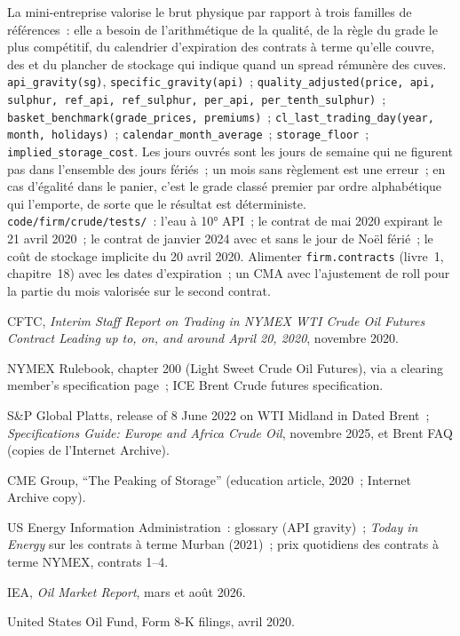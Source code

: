 \begin{build}
 La mini-entreprise valorise le brut physique par rapport à trois familles de
références~: elle a besoin de l'arithmétique de la qualité, de la règle du grade le plus compétitif, du
calendrier d'expiration des contrats à terme qu'elle couvre, des  et du plancher
de stockage qui indique quand un spread rémunère des cuves.
 \texttt{api\_gravity(sg)},
\texttt{specific\_gravity(api)}~; \texttt{quality\_adjusted(price, api, sulphur, ref\_api, ref\_sulphur, per\_api,
per\_tenth\_sulphur)}~; \texttt{basket\_benchmark(grade\_prices, premiums)}~;
\texttt{cl\_last\_trading\_day(year, month, holidays)}~;
\texttt{calendar\_month\_average}~; \texttt{storage\_floor}~;
\texttt{implied\_storage\_cost}.
 Les jours ouvrés sont les jours de semaine qui ne figurent pas dans l'ensemble des jours fériés~; un mois sans
règlement est une erreur~; en cas d'égalité dans le panier, c'est le grade classé premier par ordre alphabétique qui
l'emporte, de sorte que le résultat est déterministe.
 \texttt{code/firm/crude/tests/}~: l'eau à 10° API~; le
contrat de mai 2020 expirant le 21 avril 2020~; le contrat de janvier 2024 avec et sans
le jour de Noël férié~; le coût de stockage implicite du 20 avril 2020.
 Alimenter \texttt{firm.contracts} (livre~1, chapitre~18) avec les dates
d'expiration~; un CMA avec l'ajustement de roll pour la partie du mois valorisée sur le
second contrat.
\end{build}

\begin{omsources}
\item CFTC, \emph{Interim Staff Report on Trading in NYMEX WTI Crude Oil Futures
Contract Leading up to, on, and around April 20, 2020}, novembre 2020.
\item NYMEX Rulebook, chapter 200 (Light Sweet Crude Oil Futures), via a clearing
member's specification page~; ICE Brent Crude futures specification.
\item S\&P Global Platts, release of 8 June 2022 on WTI Midland in Dated Brent~; \emph{Specifications Guide: Europe and Africa Crude
Oil}, novembre 2025, et Brent FAQ (copies de l'Internet Archive).
\item CME Group, ``The Peaking of Storage'' (education article, 2020~; Internet Archive copy).
\item US Energy Information Administration~: glossary (API gravity)~; \emph{Today in
Energy} sur les contrats à terme Murban (2021)~; prix quotidiens des contrats à terme NYMEX, contrats 1--4.
\item IEA, \emph{Oil Market Report}, mars et août 2026.
\item United States Oil Fund, Form 8-K filings, avril 2020.
\end{omsources}

